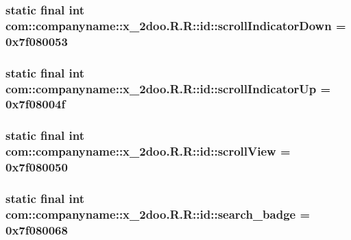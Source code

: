 \hypertarget{classcom_1_1companyname_1_1x__2doo_1_1_r_1_1id_f623ee5454197489d76ec4eab560a9e8}{
\subsubsection[{scrollIndicatorDown}]{\setlength{\rightskip}{0pt plus 5cm}static final int com::companyname::x\_\-2doo.R.R::id::scrollIndicatorDown = 0x7f080053}}
\label{classcom_1_1companyname_1_1x__2doo_1_1_r_1_1id_f623ee5454197489d76ec4eab560a9e8}


\hypertarget{classcom_1_1companyname_1_1x__2doo_1_1_r_1_1id_2275083d2e5f9317a279c4b41ddbb4f8}{
\subsubsection[{scrollIndicatorUp}]{\setlength{\rightskip}{0pt plus 5cm}static final int com::companyname::x\_\-2doo.R.R::id::scrollIndicatorUp = 0x7f08004f}}
\label{classcom_1_1companyname_1_1x__2doo_1_1_r_1_1id_2275083d2e5f9317a279c4b41ddbb4f8}


\hypertarget{classcom_1_1companyname_1_1x__2doo_1_1_r_1_1id_004dce879a4d53028b992362e0af3737}{
\subsubsection[{scrollView}]{\setlength{\rightskip}{0pt plus 5cm}static final int com::companyname::x\_\-2doo.R.R::id::scrollView = 0x7f080050}}
\label{classcom_1_1companyname_1_1x__2doo_1_1_r_1_1id_004dce879a4d53028b992362e0af3737}


\hypertarget{classcom_1_1companyname_1_1x__2doo_1_1_r_1_1id_d269828f1fab1be87a4dabafab999f6a}{
\subsubsection[{search\_\-badge}]{\setlength{\rightskip}{0pt plus 5cm}static final int com::companyname::x\_\-2doo.R.R::id::search\_\-badge = 0x7f080068}}
\label{classcom_1_1companyname_1_1x__2doo_1_1_r_1_1id_d269828f1fab1be87a4dabafab999f6a}


